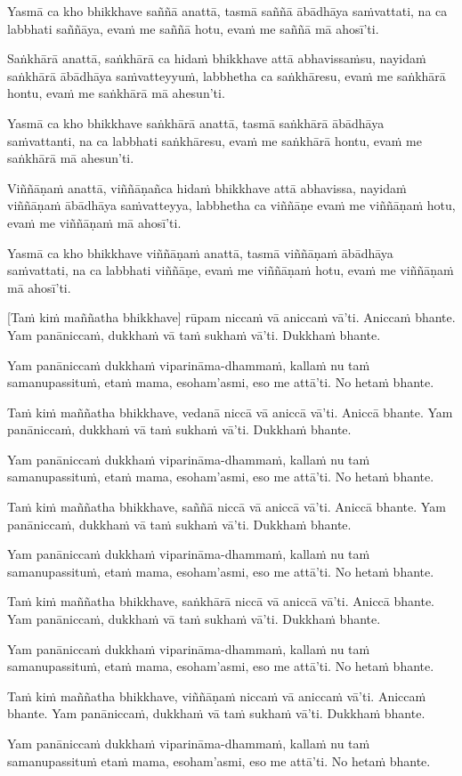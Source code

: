 Yasmā ca kho bhikkhave saññā anattā, tasmā saññā ābādhāya saṁvattati,
na ca labbhati saññāya, evaṁ me saññā hotu, evaṁ me saññā mā ahosī'ti.

Saṅkhārā anattā, saṅkhārā ca hidaṁ bhikkhave attā abhavissaṁsu, nayidaṁ
saṅkhārā ābādhāya saṁvatteyyuṁ, labbhetha ca saṅkhāresu, evaṁ me
saṅkhārā hontu, evaṁ me saṅkhārā mā ahesun'ti.

Yasmā ca kho bhikkhave saṅkhārā anattā, tasmā saṅkhārā ābādhāya
saṁvattanti, na ca labbhati saṅkhāresu, evaṁ me saṅkhārā hontu, evaṁ me
saṅkhārā mā ahesun'ti.

Viññāṇaṁ anattā, viññāṇañca hidaṁ bhikkhave attā abhavissa, nayidaṁ
viññāṇaṁ ābādhāya saṁvatteyya, labbhetha ca viññāṇe evaṁ me viññāṇaṁ
hotu, evaṁ me viññāṇaṁ mā ahosī'ti.

Yasmā ca kho bhikkhave viññāṇaṁ anattā, tasmā viññāṇaṁ ābādhāya
saṁvattati, na ca labbhati viññāṇe, evaṁ me viññāṇaṁ hotu, evaṁ me
viññāṇaṁ mā ahosī'ti.

[Taṁ kiṁ maññatha bhikkhave] rūpam niccaṁ vā aniccaṁ vā'ti.
Aniccaṁ bhante.
Yam panāniccaṁ, dukkhaṁ vā taṁ sukhaṁ vā'ti.
Dukkhaṁ bhante.

Yam panāniccaṁ dukkhaṁ viparināma-dhammaṁ, kallaṁ nu taṁ samanupassituṁ,
etaṁ mama, esoham'asmi, eso me attā'ti.
No hetaṁ bhante.

Taṁ kiṁ maññatha bhikkhave, vedanā niccā vā aniccā vā'ti.
Aniccā bhante.
Yam panāniccaṁ, dukkhaṁ vā taṁ sukhaṁ vā'ti.
Dukkhaṁ bhante.

Yam panāniccaṁ dukkhaṁ viparināma-dhammaṁ, kallaṁ nu taṁ samanupassituṁ,
etaṁ mama, esoham'asmi, eso me attā'ti.
No hetaṁ bhante.

Taṁ kiṁ maññatha bhikkhave, saññā niccā vā aniccā vā'ti.
Aniccā bhante.
Yam panāniccaṁ, dukkhaṁ vā taṁ sukhaṁ vā'ti.
Dukkhaṁ bhante.

Yam panāniccaṁ dukkhaṁ viparināma-dhammaṁ, kallaṁ nu taṁ samanupassituṁ,
etaṁ mama, esoham'asmi, eso me attā'ti.
No hetaṁ bhante.

Taṁ kiṁ maññatha bhikkhave, saṅkhārā niccā vā aniccā vā'ti.
Aniccā bhante.
Yam panāniccaṁ, dukkhaṁ vā taṁ sukhaṁ vā'ti.
Dukkhaṁ bhante.

Yam panāniccaṁ dukkhaṁ viparināma-dhammaṁ, kallaṁ nu taṁ samanupassituṁ,
etaṁ mama, esoham'asmi, eso me attā'ti.
No hetaṁ bhante.

Taṁ kiṁ maññatha bhikkhave, viññāṇaṁ niccaṁ vā aniccaṁ vā'ti.
Aniccaṁ bhante.
Yam panāniccaṁ, dukkhaṁ vā taṁ sukhaṁ vā'ti.
Dukkhaṁ bhante.

Yam panāniccaṁ dukkhaṁ viparināma-dhammaṁ, kallaṁ nu taṁ samanupassituṁ
etaṁ mama, esoham'asmi, eso me attā'ti.
No hetaṁ bhante.


